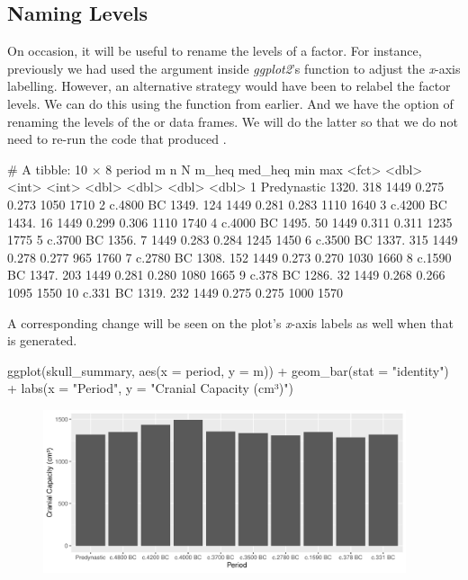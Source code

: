 \subsection{Naming Levels}

On occasion, it will be useful to rename the levels of a factor. For instance, previously we had used the  argument inside \textit{ggplot2}'s  function to adjust the \textit{x}-axis labelling. However, an alternative strategy would have been to relabel the factor levels. We can do this using the  function from earlier. And we have the option of renaming the levels of the  or  data frames. We will do the latter so that we do not need to re-run the code that produced .

\begin{outR}
# A tibble: 10 × 8
   period          m     n     N m_heq med_heq   min   max
   <fct>       <dbl> <int> <int> <dbl>   <dbl> <dbl> <dbl>
 1 Predynastic 1320.   318  1449 0.275   0.273  1050  1710
 2 c.4800 BC   1349.   124  1449 0.281   0.283  1110  1640
 3 c.4200 BC   1434.    16  1449 0.299   0.306  1110  1740
 4 c.4000 BC   1495.    50  1449 0.311   0.311  1235  1775
 5 c.3700 BC   1356.     7  1449 0.283   0.284  1245  1450
 6 c.3500 BC   1337.   315  1449 0.278   0.277   965  1760
 7 c.2780 BC   1308.   152  1449 0.273   0.270  1030  1660
 8 c.1590 BC   1347.   203  1449 0.281   0.280  1080  1665
 9 c.378 BC    1286.    32  1449 0.268   0.266  1095  1550
10 c.331 BC    1319.   232  1449 0.275   0.275  1000  1570
\end{outR}

\noindent
A corresponding change will be seen on the plot's \textit{x}-axis labels as well when that is generated.

\begin{inR}
ggplot(skull_summary, aes(x = period, y = m)) +
  geom_bar(stat = "identity") +
  labs(x = "Period", y = "Cranial Capacity (cm³)")
\end{inR}

\vspace{2em}

\begin{figure}[H]
\includegraphics[width = 0.95\textwidth]{graphics/ch3Figs/bar_3.pdf}
\end{figure}

